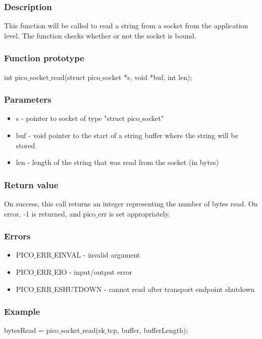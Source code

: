 \subsubsection*{Description}
This function will be called to read a string from a socket from the application level. The function checks whether or not the socket is bound.

\subsubsection*{Function prototype}
int pico$\_$socket$\_$read(struct pico$\_$socket *s, void *buf, int len);

\subsubsection*{Parameters}
\begin{itemize}
\item s - pointer to socket of type "struct pico$\_$socket"
\item buf - void pointer to the start of a string buffer where the string will be stored
\item len - length of the string that was read from the socket (in bytes)
\end{itemize}

\subsubsection*{Return value}
On success, this call returns an integer representing the number of bytes read. On error, -1 is returned, and pico$\_$err is set appropriately.

\subsubsection*{Errors}
\begin{itemize}
\item PICO$\_$ERR$\_$EINVAL - invalid argument
\item PICO$\_$ERR$\_$EIO - input/output error
\item PICO$\_$ERR$\_$ESHUTDOWN - cannot read after transport endpoint shutdown
\end{itemize}

\subsubsection*{Example}
bytesRead = pico$\_$socket$\_$read(sk$\_$tcp, buffer, bufferLength);


